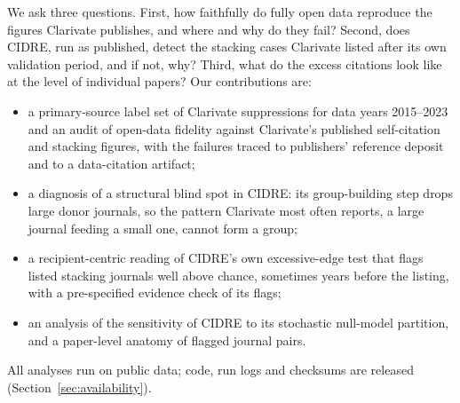 We ask three questions. First, how faithfully do fully open data reproduce the figures Clarivate publishes, and where
and why do they fail? Second, does CIDRE, run as published, detect the stacking cases Clarivate listed after its
own validation period, and if not, why? Third, what do the excess citations look like at the level of individual
papers? Our contributions are:
\begin{itemize}
  \item a primary-source label set of Clarivate suppressions for data years 2015--2023 and an audit of open-data
        fidelity against Clarivate's published self-citation and stacking figures, with the failures traced to
        publishers' reference deposit and to a data-citation artifact;
  \item a diagnosis of a structural blind spot in CIDRE: its group-building step drops large donor journals, so the
        pattern Clarivate most often reports, a large journal feeding a small one, cannot form a group;
  \item a recipient-centric reading of CIDRE's own excessive-edge test that flags listed stacking journals well above
        chance, sometimes years before the listing, with a pre-specified evidence check of its flags;
  \item an analysis of the sensitivity of CIDRE to its stochastic null-model partition, and a paper-level anatomy of
        flagged journal pairs.
\end{itemize}
All analyses run on public data; code, run logs and checksums are released (Section~\ref{sec:availability}).

